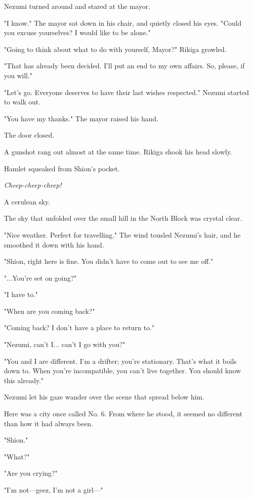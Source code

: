 Nezumi turned around and stared at the mayor.

"I know." The mayor sat down in his chair, and quietly closed his eyes.
"Could you excuse yourselves? I would like to be alone."

"Going to think about what to do with yourself, Mayor?" Rikiga growled.

"That has already been decided. I'll put an end to my own affairs. So,
please, if you will."

"Let's go. Everyone deserves to have their last wishes respected."
Nezumi started to walk out.

"You have my thanks." The mayor raised his hand.

The door closed.

A gunshot rang out almost at the same time. Rikiga shook his head
slowly.

Hamlet squeaked from Shion's pocket.

\emph{Cheep-cheep-cheep!}

\myspace

A cerulean sky.

The sky that unfolded over the small hill in the North Block was crystal
clear.

"Nice weather. Perfect for travelling." The wind tousled Nezumi's hair,
and he smoothed it down with his hand.

"Shion, right here is fine. You didn't have to come out to see me off."

"...You're set on going?"

"I have to."

"When are you coming back?"

"Coming back? I don't have a place to return to."

"Nezumi, can't I... can't I go with you?"

"You and I are different. I'm a drifter; you're stationary. That's what
it boils down to. When you're incompatible, you can't live together. You
should know this already."

Nezumi let his gaze wander over the scene that spread below him.

Here was a city once called No. 6. From where he stood, it seemed no
different than how it had always been.

"Shion."

"What?"

"Are you crying?"

"I'm not---geez, I'm not a girl---"

